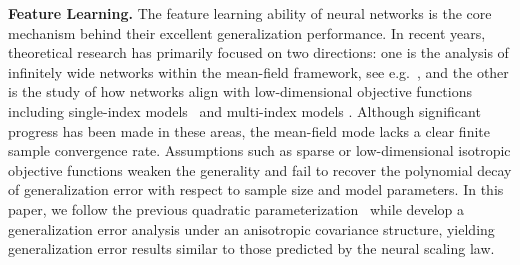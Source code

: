 \fi 
\vspace{0.2cm}
\noindent \textbf{Feature Learning.}  
The feature learning ability of neural networks is the core mechanism behind their excellent generalization performance. In recent years, theoretical research has primarily focused on two directions: one is the analysis of infinitely wide networks within the mean-field framework, see e.g.~\citet{doi:10.1073/pnas.1806579115,NEURIPS2018_a1afc58c}, and the other is the study of how networks align with low-dimensional objective functions including single-index models~\citep{ba2022high,mousavi2022neural,lee2024neural} and multi-index models \citep{damian2022neural,vural2024pruning}. Although significant progress has been made in these areas, the mean-field mode lacks a clear finite sample convergence rate. Assumptions such as sparse or low-dimensional isotropic objective functions weaken the generality and fail to recover the polynomial decay of generalization error with respect to sample size and model parameters. In this paper, we follow the previous quadratic parameterization~\citep{vaskevicius2019implicit, woodworth2020kernel, haochen21shape}  while develop a generalization error analysis under an anisotropic covariance structure, yielding generalization error results similar to those predicted by the neural scaling law.